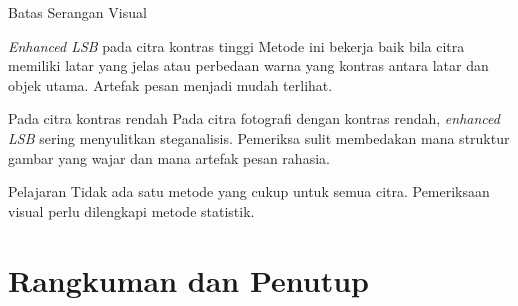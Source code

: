 \documentclass[aspectratio=169,11pt]{beamer}
\begin{document}
\begin{frame}{Batas Serangan Visual}
    \begin{exampleblock}{\textit{Enhanced LSB} pada citra kontras tinggi}
        \footnotesize
        Metode ini bekerja baik bila citra memiliki latar yang jelas atau
        perbedaan warna yang kontras antara latar dan objek utama. Artefak
        pesan menjadi mudah terlihat.
    \end{exampleblock}
    \vspace{0.1cm}
    \begin{alertblock}{Pada citra kontras rendah}
        \footnotesize
        Pada citra fotografi dengan kontras rendah, \textit{enhanced LSB}
        sering menyulitkan steganalisis. Pemeriksa sulit membedakan mana
        struktur gambar yang wajar dan mana artefak pesan rahasia.
    \end{alertblock}
    \vspace{0.1cm}
    \begin{block}{Pelajaran}
        \footnotesize
        Tidak ada satu metode yang cukup untuk semua citra. Pemeriksaan visual
        perlu dilengkapi metode statistik.
    \end{block}
\end{frame}

\section{Rangkuman dan Penutup}
\end{document}
